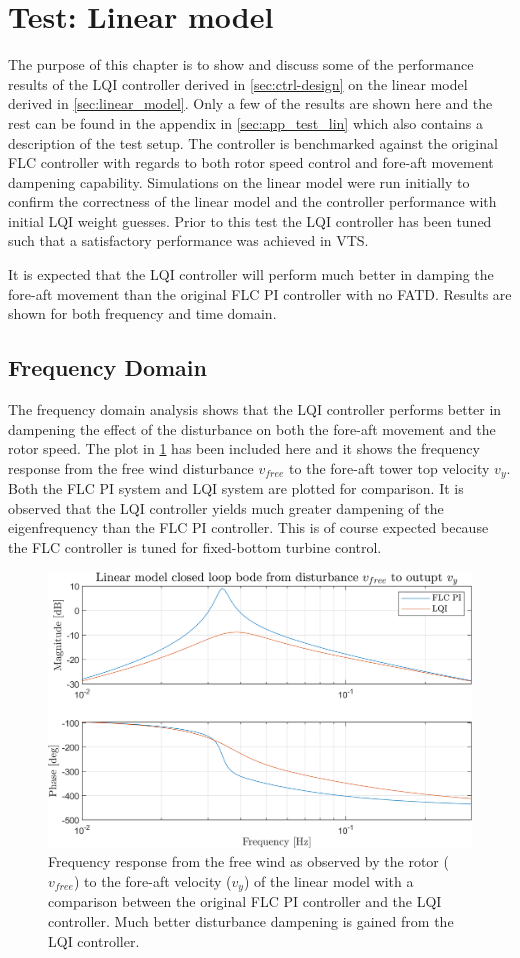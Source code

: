 \section{Test: Linear model} \label{sec:test_lin}
The purpose of this chapter is to show and discuss some of the performance results of the LQI controller derived in \cref{sec:ctrl-design} on the linear model derived in \cref{sec:linear_model}. Only a few of the results are shown here and the rest can be found in the appendix in \cref{sec:app_test_lin} which also contains a description of the test setup. The controller is benchmarked against the original FLC controller with regards to both rotor speed control and fore-aft movement dampening capability. Simulations on the linear model were run initially to confirm the correctness of the linear model and the controller performance with initial LQI weight guesses. Prior to this test the LQI controller has been tuned such that a satisfactory performance was achieved in VTS.

It is expected that the LQI controller will perform much better in damping the fore-aft movement than the original FLC PI controller with no FATD. Results are shown for both frequency and time domain.


\subsection{Frequency Domain}
The frequency domain analysis shows that the LQI controller performs better in dampening the effect of the disturbance on both the fore-aft movement and the rotor speed. The plot in \cref{fig:script_vfreeTovy} has been included here and it shows the frequency response from the free wind disturbance $ v_{free} $ to the fore-aft tower top velocity $ v_y $. Both the FLC PI system and LQI system are plotted for comparison. It is observed that the LQI controller yields much greater dampening of the eigenfrequency than the FLC PI controller. This is of course expected because the FLC controller is tuned for fixed-bottom turbine control.
\begin{figure}[ht]
	\centering
	\includegraphics[width=0.7\linewidth]{Graphics/TestResults/linearModPerf/script_vfreeTovy.png}
	\caption{Frequency response from the free wind as observed by the rotor ($ v_{free} $) to the fore-aft velocity ($ v_y $) of the linear model with a comparison between the original FLC PI controller and the LQI controller. Much better disturbance dampening is gained from the LQI controller.}
	\label{fig:script_vfreeTovy}
\end{figure}


